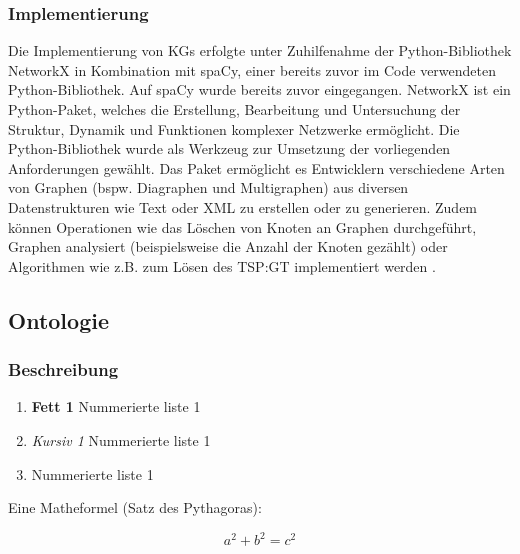 \subsubsection{Implementierung}
Die Implementierung von KGs erfolgte unter Zuhilfenahme der Python-Bibliothek NetworkX in Kombination mit spaCy, einer bereits zuvor im Code verwendeten Python-Bibliothek. Auf spaCy wurde bereits zuvor eingegangen.
NetworkX ist ein Python-Paket, welches die Erstellung, Bearbeitung und Untersuchung der Struktur, Dynamik und Funktionen komplexer Netzwerke ermöglicht. Die Python-Bibliothek wurde als Werkzeug zur Umsetzung der vorliegenden Anforderungen gewählt. Das Paket ermöglicht es Entwicklern verschiedene Arten von Graphen (bspw. Diagraphen und Multigraphen) aus diversen Datenstrukturen wie Text oder XML zu erstellen oder zu generieren. Zudem können Operationen wie das Löschen von Knoten an Graphen durchgeführt, Graphen analysiert (beispielsweise die Anzahl der Knoten gezählt) oder Algorithmen wie z.B. zum Lösen des \ac{TSP:GT}  implementiert werden \cite{networkX:Docs}. 

\subsection{Ontologie}

\subsubsection{Beschreibung}





\begin{enumerate}
    \item \textbf{Fett 1} Nummerierte liste 1
    \item \textit{Kursiv 1} Nummerierte liste 1
    \item Nummerierte liste 1
\end{enumerate}


Eine Matheformel (Satz des Pythagoras):

\[
a^2 + b^2 = c^2
\]

